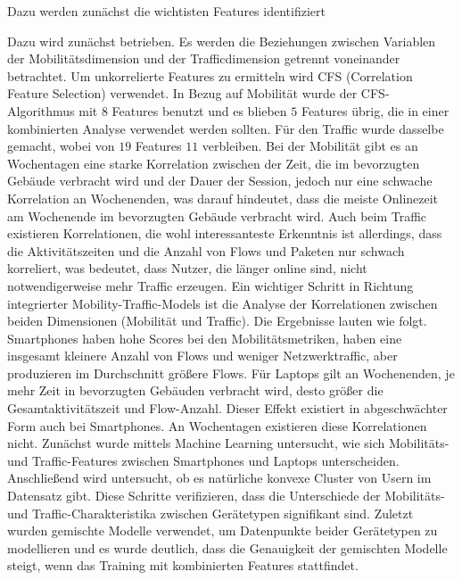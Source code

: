 \documentclass[12pt, a4paper]{article}
\begin{document}
Dazu werden zunächst die wichtisten Features identifiziert

Dazu wird zunächst  betrieben. Es werden die Beziehungen zwischen Variablen der Mobilitätsdimension
und der Trafficdimension getrennt voneinander betrachtet. Um unkorrelierte Features zu ermitteln wird \textsc{CFS} 
(Correlation Feature Selection) verwendet. In Bezug auf Mobilität wurde der \textsc{CFS}-Algorithmus mit $8$ Features
benutzt und es blieben $5$ Features übrig, die in einer kombinierten Analyse verwendet werden sollten.
Für den Traffic wurde dasselbe gemacht, wobei von $19$ Features $11$ verbleiben.\newline
Bei der Mobilität gibt es an Wochentagen eine starke Korrelation zwischen der Zeit, die im bevorzugten Gebäude 
verbracht wird und der Dauer der Session, jedoch nur eine schwache Korrelation an Wochenenden, was darauf hindeutet,
dass die meiste Onlinezeit am Wochenende im bevorzugten Gebäude verbracht wird.\newline
Auch beim Traffic existieren Korrelationen, die wohl interessanteste Erkenntnis ist allerdings, dass die
Aktivitätszeiten und die Anzahl von Flows und Paketen nur schwach korreliert, was bedeutet, dass Nutzer,
die länger online sind, nicht notwendigerweise mehr Traffic erzeugen.
\newline\newline
Ein wichtiger Schritt in Richtung integrierter Mobility-Traffic-Models ist die Analyse der Korrelationen
zwischen beiden Dimensionen (Mobilität und Traffic).\newline
Die Ergebnisse lauten wie folgt. Smartphones haben hohe Scores bei den Mobilitätsmetriken, haben eine
insgesamt kleinere Anzahl von Flows und weniger Netzwerktraffic, aber produzieren im Durchschnitt größere Flows.
Für Laptops gilt an Wochenenden, je mehr Zeit in bevorzugten Gebäuden verbracht wird, desto größer die Gesamtaktivitätszeit
und Flow-Anzahl. Dieser Effekt existiert in abgeschwächter Form auch bei Smartphones. 
An Wochentagen existieren diese Korrelationen nicht.
\newline\newline
Zunächst wurde mittels Machine Learning untersucht, wie sich Mobilitäts- und Traffic-Features zwischen
Smartphones und Laptops unterscheiden. Anschließend wird untersucht, ob es natürliche konvexe Cluster von Usern im
Datensatz gibt. Diese Schritte verifizieren, dass die Unterschiede der Mobilitäts- und Traffic-Charakteristika zwischen
Gerätetypen signifikant sind.
\newline\newline
Zuletzt wurden gemischte Modelle verwendet, um Datenpunkte beider Gerätetypen zu modellieren
und es wurde deutlich, dass die Genauigkeit der gemischten Modelle steigt, wenn das Training mit kombinierten Features stattfindet.
\end{document}
